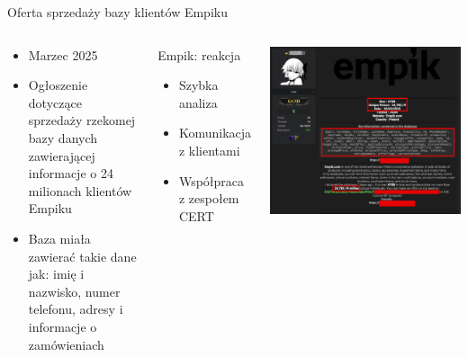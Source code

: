 \begin{frame}{Oferta sprzedaży bazy klientów Empiku}
\begin{columns}[c]
    \begin{block}{}
      \begin{itemize}
        \item Marzec 2025
        \item Ogłoszenie dotyczące sprzedaży rzekomej bazy danych zawierającej informacje o 24 milionach klientów Empiku
        \item Baza miała zawierać takie dane jak: imię i nazwisko, numer telefonu, adresy i informacje o zamówieniach
      \end{itemize}
      \end{block}
    \begin{exampleblock}{Empik: reakcja}
    \begin{itemize}
      \item Szybka analiza
      \item Komunikacja z klientami
      \item Współpraca z zespołem CERT \cite{empik}
    \end{itemize}
    \end{exampleblock}
    \includegraphics[width=1\textwidth]{images/empik-wyciek.jpg}
\end{columns}
\end{frame}

